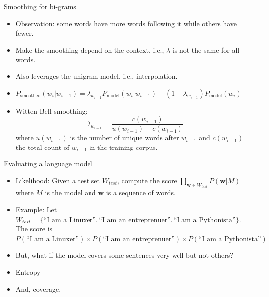 \documentclass[11pt]{beamer}
\begin{document}
\begin{frame}{Smoothing for bi-grams}
 \begin{itemize}[<+->]
  \item Observation: some words have more words following it while others have fewer. 
  \item Make the smoothing depend on the context, i.e., $\lambda$ is not the same for all words. 
  \item Also leverages the unigram model, i.e., interpolation. 
  \item $P_{\text{smoothed}}(w_i|w_{i-1}) = \lambda_{w_{i-1}} P_{\text{model}}(w_i|w_{i-1}) + (1-\lambda_{w_{i-1}})P_{\text{model}}(w_i)$
  \item Witten-Bell smoothing: $$\lambda_{w_{i-1}} = \frac{c(w_{i-1})}{u(w_{i-1}) + c(w_{i-1})}$$ where 
  $u(w_{i-1})$ is the number of unique words after $w_{i-1}$ and $c(w_{i-1})$ the total count of $w_{i-1}$ in the training corpus. 
 \end{itemize}
\end{frame}


\begin{frame}{Evaluating a language model}
 \begin{itemize}[<+->]
  \item Likelihood: Given a test set $W_{test}$, compute the score $\prod\limits_{\mathbf{w}\in W_{test}} P(\mathbf{w} |M)$ where $M$ is the model and $\mathbf{w}$ is a sequence of words. 
  \item Example: Let $W_{test} = \{ \text{``I am a Linuxer''}, \text{``I am an entreprenuer''}, \text{``I am a Pythonista''}\}$. The score is $P(\text{``I am a Linuxer''}) \times P( \text{``I am an entreprenuer''}) \times  P( \text{``I am a Pythonista''}) $
  \item But, what if the model covers some sentences very well but not others? 
  \item Entropy
  \item And, coverage. 
 \end{itemize}
\end{frame}
\end{document}
